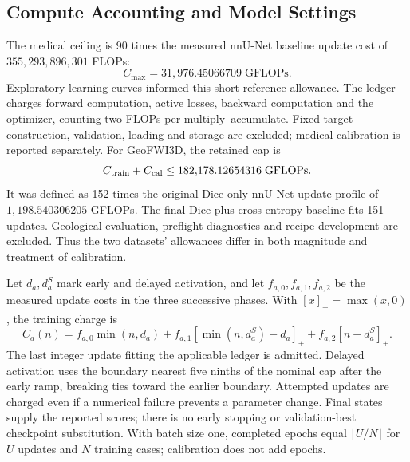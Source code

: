 \subsection{Compute Accounting and Model Settings}
\label{sec:detailed-resource-accounting}\label{sec:geological-budget-details}
\label{sec:implementation-tables}\label{sec:conventional-implementation}

The medical ceiling is 90 times the measured nnU-Net baseline update
cost of $355{,}293{,}896{,}301$ FLOPs:
\begin{equation}
C_{\max}=31{,}976.45066709\;\mathrm{GFLOPs}.
\label{eq:main-numerical-cap}
\end{equation}
Exploratory learning curves informed this short reference allowance.
The ledger charges forward computation, active losses, backward
computation and the optimizer, counting two FLOPs per
multiply--accumulate. Fixed-target construction, validation, loading
and storage are excluded; medical calibration is reported separately.
For GeoFWI3D, the retained cap is
\begin{equation}
C_{\rm train}+C_{\rm cal}\leq182{,}178.12654316\;\mathrm{GFLOPs}.
\label{eq:geological-compute-cap}
\end{equation}
It was defined as 152 times the original Dice-only nnU-Net update
profile of $1{,}198.540306205$ GFLOPs. The final Dice-plus-cross-entropy
baseline fits 151 updates. Geological evaluation, preflight diagnostics
and recipe development are excluded. Thus the two datasets' allowances
differ in both magnitude and treatment of calibration.

Let $d_a,d_a^S$ mark early and delayed activation, and let
$f_{a,0},f_{a,1},f_{a,2}$ be the measured update costs in the three
successive phases. With $[x]_+=\max(x,0)$, the training charge is
\begin{equation}
C_a(n)=f_{a,0}\min(n,d_a)
+f_{a,1}[\min(n,d_a^S)-d_a]_+
+f_{a,2}[n-d_a^S]_+.
\label{eq:piecewise-optimization-cost}
\end{equation}
The last integer update fitting the applicable ledger is admitted.
Delayed activation uses the boundary nearest five ninths of the
nominal cap after the early ramp, breaking ties toward the earlier
boundary. Attempted updates are charged even if a numerical failure
prevents a parameter change. Final states supply the reported scores;
there is no early stopping or validation-best checkpoint substitution.
With batch size one, completed epochs equal $\lfloor U/N\rfloor$
for $U$ updates and $N$ training cases; calibration does not add epochs.

